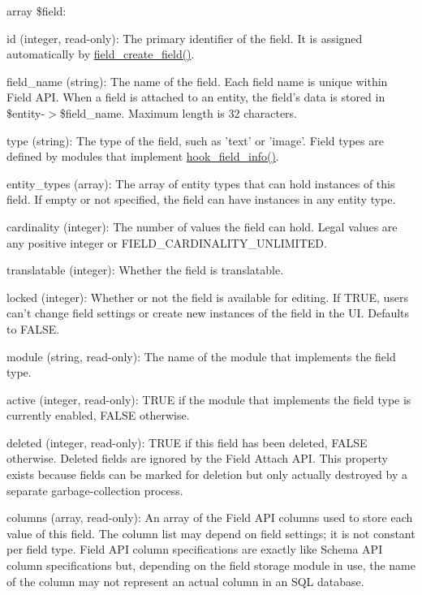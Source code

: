 array \$field:
\begin{DoxyItemize}
\item id (integer, read-\/only): The primary identifier of the field. It is assigned automatically by \hyperlink{group__field__crud_ga0f879889d2da2b5d638252d7eb027746}{field\_\-create\_\-field()}.
\item field\_\-name (string): The name of the field. Each field name is unique within Field API. When a field is attached to an entity, the field's data is stored in \$entity-\/$>$\$field\_\-name. Maximum length is 32 characters.
\item type (string): The type of the field, such as 'text' or 'image'. Field types are defined by modules that implement \hyperlink{group__field__types_gad3eb779f26f41b520f19af011ece3eb1}{hook\_\-field\_\-info()}.
\item entity\_\-types (array): The array of entity types that can hold instances of this field. If empty or not specified, the field can have instances in any entity type.
\item cardinality (integer): The number of values the field can hold. Legal values are any positive integer or FIELD\_\-CARDINALITY\_\-UNLIMITED.
\item translatable (integer): Whether the field is translatable.
\item locked (integer): Whether or not the field is available for editing. If TRUE, users can't change field settings or create new instances of the field in the UI. Defaults to FALSE.
\item module (string, read-\/only): The name of the module that implements the field type.
\item active (integer, read-\/only): TRUE if the module that implements the field type is currently enabled, FALSE otherwise.
\item deleted (integer, read-\/only): TRUE if this field has been deleted, FALSE otherwise. Deleted fields are ignored by the Field Attach API. This property exists because fields can be marked for deletion but only actually destroyed by a separate garbage-\/collection process.
\item columns (array, read-\/only): An array of the Field API columns used to store each value of this field. The column list may depend on field settings; it is not constant per field type. Field API column specifications are exactly like Schema API column specifications but, depending on the field storage module in use, the name of the column may not represent an actual column in an SQL database.

\end{DoxyItemize}
